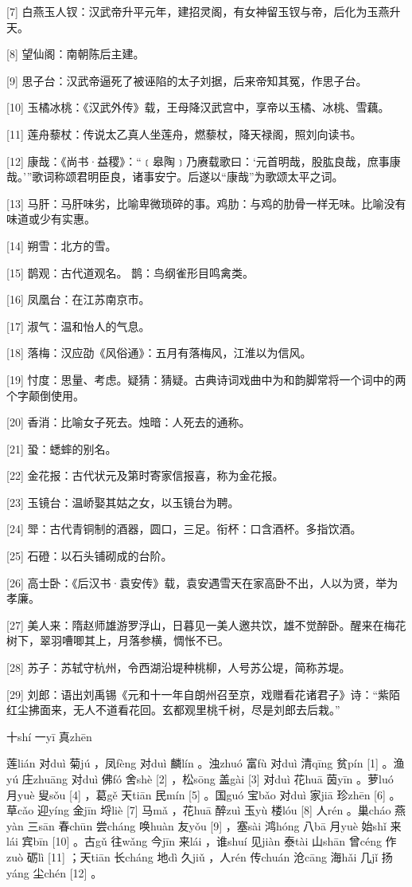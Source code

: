 \documentclass[12pt,UTF8]{ctexbook}
\begin{document}
[7] 白燕玉人钗：汉武帝升平元年，建招灵阁，有女神留玉钗与帝，后化为玉燕升天。

[8] 望仙阁：南朝陈后主建。

[9] 思子台：汉武帝逼死了被诬陷的太子刘据，后来帝知其冤，作思子台。

[10] 玉橘冰桃：《汉武外传》载，王母降汉武宫中，享帝以玉橘、冰桃、雪藕。

[11] 莲舟藜杖：传说太乙真人坐莲舟，燃藜杖，降天禄阁，照刘向读书。

[12] 康哉：《尚书·益稷》：“﹝皋陶﹞乃赓载歌曰：‘元首明哉，股肱良哉，庶事康哉。’”歌词称颂君明臣良，诸事安宁。后遂以“康哉”为歌颂太平之词。

[13] 马肝：马肝味劣，比喻卑微琐碎的事。鸡肋：与鸡的肋骨一样无味。比喻没有味道或少有实惠。

[14] 朔雪：北方的雪。

[15] 鹊观：古代道观名。 鹊：鸟纲雀形目鸣禽类。

[16] 凤凰台：在江苏南京市。

[17] 淑气：温和怡人的气息。

[18] 落梅：汉应劭《风俗通》：五月有落梅风，江淮以为信风。

[19] 忖度：思量、考虑。疑猜：猜疑。古典诗词戏曲中为和韵脚常将一个词中的两个字颠倒使用。

[20] 香消：比喻女子死去。烛暗：人死去的通称。

[21] 蛩：蟋蟀的别名。

[22] 金花报：古代状元及第时寄家信报喜，称为金花报。

[23] 玉镜台：温峤娶其姑之女，以玉镜台为聘。

[24] 斝：古代青铜制的酒器，圆口，三足。衔杯：口含酒杯。多指饮酒。

[25] 石磴：以石头铺砌成的台阶。

[26] 高士卧：《后汉书·袁安传》载，袁安遇雪天在家高卧不出，人以为贤，举为孝廉。

[27] 美人来：隋赵师雄游罗浮山，日暮见一美人邀共饮，雄不觉醉卧。醒来在梅花树下，翠羽嘈唧其上，月落参横，惆怅不已。

[28] 苏子：苏轼守杭州，令西湖沿堤种桃柳，人号苏公堤，简称苏堤。

[29] 刘郎：语出刘禹锡《元和十一年自朗州召至京，戏赠看花诸君子》诗：“紫陌红尘拂面来，无人不道看花回。玄都观里桃千树，尽是刘郎去后栽。”





十shí 一yī 真zhēn


莲lián 对duì 菊jú ，凤fèng 对duì 麟lín 。浊zhuó 富fù 对duì 清qīng 贫pín [1] 。渔yú 庄zhuāng 对duì 佛fó 舍shè [2] ，松sōng 盖gài [3] 对duì 花huā 茵yīn 。萝luó 月yuè 叟sǒu [4] ，葛gě 天tiān 民mín [5] 。国guó 宝bǎo 对duì 家jiā 珍zhēn [6] 。草cǎo 迎yíng 金jīn 埒liè [7] 马mǎ ，花huā 醉zuì 玉yù 楼lóu [8] 人rén 。巢cháo 燕yàn 三sān 春chūn 尝cháng 唤huàn 友yǒu [9] ，塞sài 鸿hóng 八bā 月yuè 始shǐ 来lái 宾bīn [10] 。古gǔ 往wǎng 今jīn 来lái ，谁shuí 见jiàn 泰tài 山shān 曾céng 作zuò 砺lì [11] ；天tiān 长cháng 地dì 久jiǔ ，人rén 传chuán 沧cāng 海hǎi 几jǐ 扬yáng 尘chén [12] 。
\end{document}
